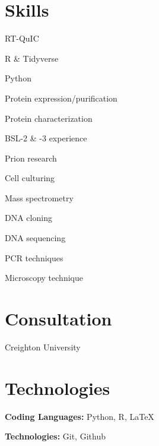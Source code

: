 \documentclass{resume}
\begin{document}
    \section{Skills}
        \begin{skills}
            \item RT-QuIC
            \item R \& Tidyverse
            \item Python
            \item Protein expression/purification
            \item Protein characterization
            \item BSL-2 \& -3 experience
            \item Prion research
            \item Cell culturing
            \item Mass spectrometry
            \item DNA cloning
            \item DNA sequencing
            \item PCR techniques
            \item Microscopy technique
        \end{skills}

    \section{Consultation}
        Creighton University

    \section{Technologies}
        \begin{onecolentry}
            \textbf{Coding Languages:} Python, R, \LaTeX{}
        \end{onecolentry}

        \vspace{0.2 cm}

        \begin{onecolentry}
            \textbf{Technologies:} Git, Github
        \end{onecolentry}
\end{document}
